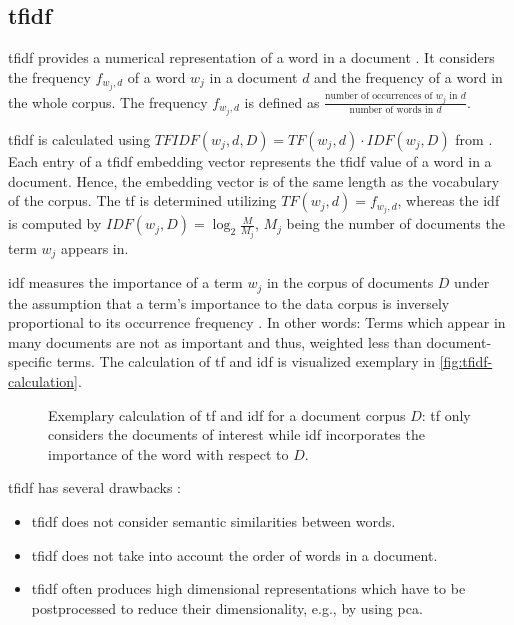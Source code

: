 \subsection{\acl*{tfidf}}\label{subsec:tfidf}

\ac{tfidf} provides a numerical representation of a word in a document \cite{clusteringDocs2020}.
It considers the frequency $f_{w_{j}, d}$  of a word $w_{j}$ in a document $d$ and the frequency of a word in the whole corpus. 
The frequency $f_{w_{j}, d}$ is defined as $\frac{\text{number of occurrences of } w_{j} \text{ in }d}{\text{number of words in }d}$.

\ac{tfidf} is calculated using $TFIDF(w_{j}, d, D) = TF(w_{j}, d) \cdot IDF(w_{j}, D)$ from \cite{clusteringDocs2020}.
Each entry of a \ac{tfidf} embedding vector represents the \ac{tfidf} value of a word in a document.
Hence, the embedding vector is of the same length as the vocabulary of the corpus.
The \ac{tf} is determined utilizing $TF(w_{j}, d) = f_{w_{j}, d}$, whereas the \ac{idf} is computed by $IDF(w_{j}, D) = \log_2\frac{M}{M_{j}}$, 
$M_{j}$ being the number of documents the term $w_{j}$ appears in.

\ac{idf} measures the importance of a term $w_{j}$ in the corpus of documents $D$
under the assumption that a term's importance to the data corpus is inversely proportional to its occurrence frequency \cite{tfidf2008}.
In other words: Terms which appear in many documents are not as important and thus, weighted less than document-specific terms. 
The calculation of \ac{tf} and \ac{idf} is visualized exemplary in \autoref{fig:tfidf-calculation}.


\begin{figure}[!htb] %
    \centering
    
    \caption[Exemplary calculation of \acs*{tf} and \acs*{idf} values]{
        Exemplary calculation of \acs*{tf} and \acs*{idf} for a document corpus $D$: 
        \acs*{tf} only considers the documents of interest while 
        \acs*{idf} incorporates the importance of the word with respect to $D$.
    }
    \label{fig:tfidf-calculation}
\end{figure}

\ac{tfidf} has several drawbacks \cite{clusteringDocs2020,tfidf2008}:
\begin{itemize}
    \item \ac{tfidf} does not consider semantic similarities between words.
    \item \ac{tfidf} does not take into account the order of words in a document.
    \item \ac{tfidf} often produces high dimensional representations which have to be postprocessed to reduce their dimensionality, e.g., by using \ac{pca}.
\end{itemize}


